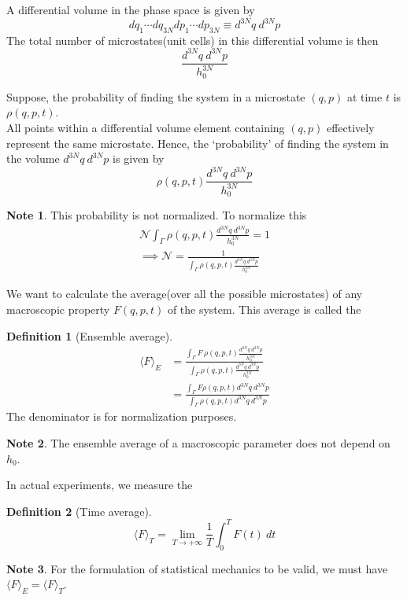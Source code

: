 \documentclass[10pt, a4paper]{extarticle}
\theoremstyle{definition}
\newtheorem{defn}{Definition}
\newtheorem*{note*}{Note}
\begin{document}
A differential volume in the phase space is given by
\[dq_1\cdots dq_{3N}dp_1\cdots dp_{3N}\equiv d^{3N}q\ d^{3N}p\]
The total number of microstates(unit cells) in this differential volume is then
\[\frac{d^{3N}q\ d^{3N}p}{h_0^{3N}}\]
\begin{framed}
Suppose, the probability of finding the system in a microstate $(q,p)$ at time $t$ is $\rho(q,p,t)$.\\
All points within a differential volume element containing $(q,p)$ effectively represent the same microstate. Hence, the `probability' of finding the system in the volume $d^{3N}q\ d^{3N}p$ is given by \[\rho(q,p,t)\frac{d^{3N}q\ d^{3N}p}{h_0^{3N}}\]
\begin{note*}
	This probability is not normalized. To normalize this
	\begin{align*}
		\mathcal{N}\int_{\Gamma}\rho(q,p,t)\frac{d^{3N}q\ d^{3N}p}{h_0^{3N}}=1\\
		\implies \mathcal{N}=\frac{1}{\int_{\Gamma}\rho(q,p,t)\frac{d^{3N}q\ d^{3N}p}{h_0^{3N}}}
	\end{align*}
\end{note*}
\end{framed}
We want to calculate the average(over all the possible microstates) of any macroscopic property $F(q,p,t)$ of the system. This average is called the
\begin{framed}
	\begin{defn}[Ensemble average]
		\begin{align*}
			\langle F\rangle_E&=\frac{\int_{\Gamma}F\ \rho(q,p,t)\frac{d^{3N}q\ d^{3N}p}{h_0^{3N}}}{\int_{\Gamma}\rho(q,p,t)\frac{d^{3N}q\ d^{3N}p}{h_0^{3N}}}\\
							  &=\frac{\int_{\Gamma}F\rho(q,p,t)d^{3N}q\ d^{3N}p}{\int_{\Gamma}\rho(q,p,t)d^{3N}q\ d^{3N}p}
		\end{align*}
		The denominator is for normalization purposes.
	\end{defn}
	\begin{note*}
		The ensemble average of a macroscopic parameter does not depend on $h_0$.
	\end{note*}
\end{framed}

In actual experiments, we measure the
\begin{framed}
	\begin{defn}[Time average]
		\[\langle F\rangle_T=\lim_{T\to +\infty}\frac{1}{T}\int_0^T F(t)\ dt\]
	\end{defn}
\end{framed}
\begin{note*}
	For the formulation of statistical mechanics to be valid, we must have $\langle F\rangle_E=\langle F\rangle_T$.
\end{note*}
\end{document}
